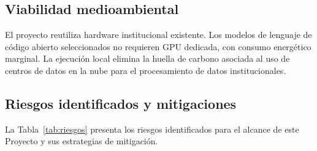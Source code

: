 \documentclass[a4paper, 12pt]{article}
\begin{document}
\subsection{Viabilidad medioambiental}

El proyecto reutiliza hardware institucional existente. Los modelos de lenguaje de c\'odigo abierto seleccionados no requieren GPU dedicada, con consumo energ\'etico marginal. La ejecuci\'on local elimina la huella de carbono asociada al uso de centros de datos en la nube para el procesamiento de datos institucionales.

\subsection{Riesgos identificados y mitigaciones}

La Tabla~\ref{tab:riesgos} presenta los riesgos identificados para el alcance de este Proyecto y sus estrategias de mitigaci\'on.
\end{document}

